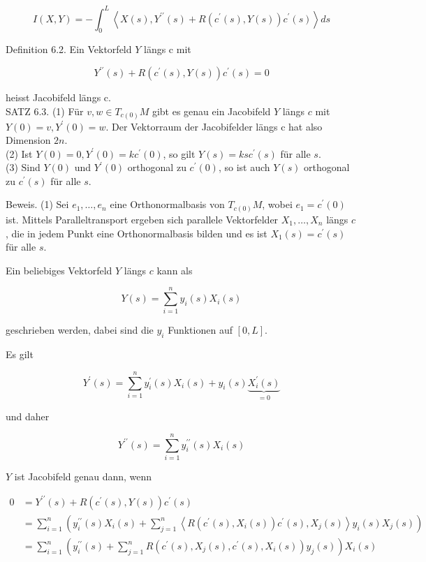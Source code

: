 \documentclass[10pt, letterpaper]{article}
\begin{document}
$$
I(X, Y)=-\int_{0}^{L}\left\langle X(s), Y^{\prime \prime}(s)+R\left(c^{\prime}(s), Y(s)\right) c^{\prime}(s)\right\rangle d s
$$

Definition 6.2. Ein Vektorfeld $Y$ längs c mit


\begin{equation*}
Y^{\prime \prime}(s)+R\left(c^{\prime}(s), Y(s)\right) c^{\prime}(s)=0 \tag{7}
\end{equation*}


heisst Jacobifeld längs c.\\
SATZ 6.3. (1) Für $v, w \in T_{c(0)} M$ gibt es genau ein Jacobifeld $Y$ längs $c$ mit $Y(0)=v, Y^{\prime}(0)=w$. Der Vektorraum der Jacobifelder längs c hat also Dimension $2 n$.\\
(2) Ist $Y(0)=0, Y^{\prime}(0)=k c^{\prime}(0)$, so gilt $Y(s)=k s c^{\prime}(s)$ für alle $s$.\\
(3) Sind $Y(0)$ und $Y^{\prime}(0)$ orthogonal zu $c^{\prime}(0)$, so ist auch $Y(s)$ orthogonal zu $c^{\prime}(s)$ für alle $s$.

Beweis. (1) Sei $e_{1}, \ldots, e_{n}$ eine Orthonormalbasis von $T_{c(0)} M$, wobei $e_{1}=c^{\prime}(0)$ ist. Mittels Paralleltransport ergeben sich parallele Vektorfelder $X_{1}, \ldots, X_{n}$ längs $c$, die in jedem Punkt eine Orthonormalbasis bilden und es ist $X_{1}(s)=c^{\prime}(s)$ für alle $s$.

Ein beliebiges Vektorfeld $Y$ längs $c$ kann als

$$
Y(s)=\sum_{i=1}^{n} y_{i}(s) X_{i}(s)
$$

geschrieben werden, dabei sind die $y_{i}$ Funktionen auf $[0, L]$.

Es gilt

$$
Y^{\prime}(s)=\sum_{i=1}^{n} y_{i}^{\prime}(s) X_{i}(s)+y_{i}(s) \underbrace{X_{i}^{\prime}(s)}_{=0}
$$

und daher

$$
Y^{\prime \prime}(s)=\sum_{i=1}^{n} y_{i}^{\prime \prime}(s) X_{i}(s)
$$

$Y$ ist Jacobifeld genau dann, wenn

$$
\begin{aligned}
0 & =Y^{\prime \prime}(s)+R\left(c^{\prime}(s), Y(s)\right) c^{\prime}(s) \\
& =\sum_{i=1}^{n}\left(y_{i}^{\prime \prime}(s) X_{i}(s)+\sum_{j=1}^{n}\left\langle R\left(c^{\prime}(s), X_{i}(s)\right) c^{\prime}(s), X_{j}(s)\right\rangle y_{i}(s) X_{j}(s)\right) \\
& =\sum_{i=1}^{n}\left(y_{i}^{\prime \prime}(s)+\sum_{j=1}^{n} R\left(c^{\prime}(s), X_{j}(s), c^{\prime}(s), X_{i}(s)\right) y_{j}(s)\right) X_{i}(s)
\end{aligned}
$$
\end{document}
